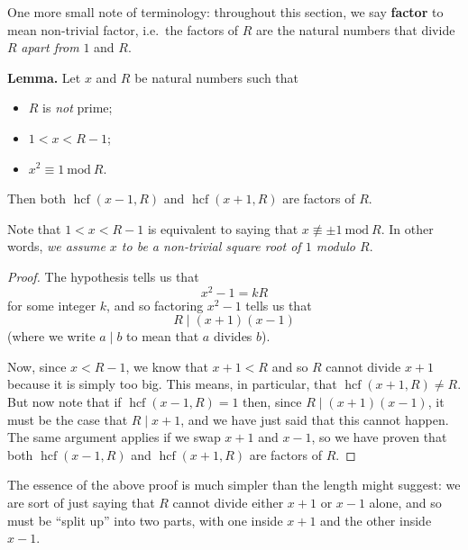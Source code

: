 \documentclass[fleqn,a4paper]{article}
\providecommand{\tightlist}{\setlength{\itemsep}{0pt}\setlength{\parskip}{0pt}}
\newenvironment{idea}{\everypar{\setlength{\parindent}{1.5em}}}{}
\theoremstyle{definition}
\theoremstyle{definition}
\theoremstyle{definition}
\theoremstyle{definition}
\theoremstyle{remark}
\begin{document}
One more small note of terminology: throughout this section, we say \textbf{factor} to mean non-trivial factor, i.e.~the factors of \(R\) are the natural numbers that divide \(R\) \emph{apart from} \(1\) and \(R\).

\begin{idea}
\textbf{Lemma.}
Let \(x\) and \(R\) be natural numbers such that

\begin{itemize}
\tightlist
\item
  \(R\) is \emph{not} prime;
\item
  \(1<x<R-1\);
\item
  \(x^2\equiv1\ \mathrm{mod}\ R\).
\end{itemize}

Then both \(\operatorname{hcf}(x-1,R)\) and \(\operatorname{hcf}(x+1,R)\) are factors of \(R\).

\end{idea}

Note that \(1<x<R-1\) is equivalent to saying that \(x\not\equiv\pm1\ \mathrm{mod}\ R\).
In other words, \emph{we assume \(x\) to be a non-trivial square root of \(1\) modulo \(R\)}.

\begin{proof}
The hypothesis tells us that
\[
  x^2-1 = kR
\]
for some integer \(k\), and so factoring \(x^2-1\) tells us that
\[
  R \mathbin{\vert}(x+1)(x-1)
\]
(where we write \(a\mathbin{\vert}b\) to mean that \(a\) divides \(b\)).

Now, since \(x<R-1\), we know that \(x+1<R\) and so \(R\) cannot divide \(x+1\) because it is simply too big.
This means, in particular, that \(\operatorname{hcf}(x+1,R)\neq R\).
But now note that if \(\operatorname{hcf}(x-1,R)=1\) then, since \(R\mathbin{\vert}(x+1)(x-1)\), it must be the case that \(R\mathbin{\vert}x+1\), and we have just said that this cannot happen.
The same argument applies if we swap \(x+1\) and \(x-1\), so we have proven that both \(\operatorname{hcf}(x-1,R)\) and \(\operatorname{hcf}(x+1,R)\) are factors of \(R\).
\end{proof}

The essence of the above proof is much simpler than the length might suggest: we are sort of just saying that \(R\) cannot divide either \(x+1\) or \(x-1\) alone, and so must be ``split up'' into two parts, with one inside \(x+1\) and the other inside \(x-1\).
\end{document}
